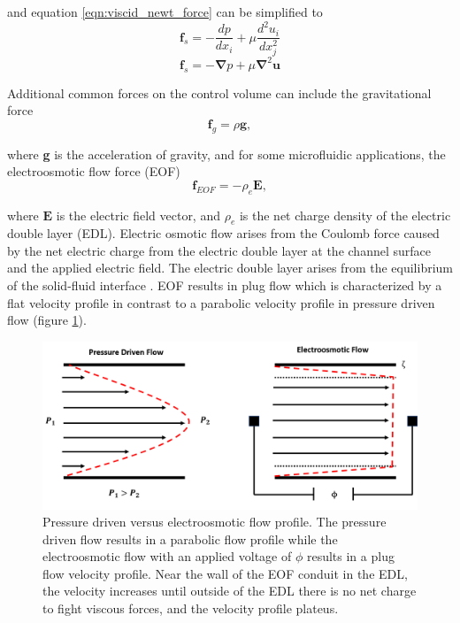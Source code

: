 \noindent and equation \ref{eqn:viscid_newt_force} can be simplified to 
\begin{equation}
    \textbf{f}_s = -\frac{dp}{dx_i} + \mu \frac{d^2u_i}{dx^2_j}
\end{equation}
\begin{equation}
    \textbf{f}_s = -\boldsymbol{\nabla}p + \mu\boldsymbol{\nabla}^2\textbf{u}
    \label{eqn:viscous_pressure_force}
\end{equation}

\par Additional common forces on the control volume can include the gravitational force
\begin{equation}
    \textbf{f}_g = \rho \textbf{g},
    \label{eqn:gravity_force}
\end{equation}

\noindent where \textbf{g} is the acceleration of gravity, and for some microfluidic applications, the electroosmotic flow force (EOF)
\begin{equation}
    \textbf{f}_{EOF} = -\rho_e \boldsymbol{E},
\end{equation}

\noindent where $\boldsymbol{E}$ is the electric field vector, and $\rho_e$ is the net charge density of the electric double layer (EDL). Electric osmotic flow arises from the Coulomb force caused by the net electric charge from the electric double layer at the channel surface and the applied electric field. The electric double layer arises from the equilibrium of the solid-fluid interface \cite{kirby_micro-and_2010}. EOF results in plug flow which is characterized by a flat velocity profile in contrast to a parabolic velocity profile in pressure driven flow (figure \ref{fig:plug_vs_parabolic_flow}).

\begin{figure}[ht]
    \centering
    \includegraphics[width = \textwidth]{images/plugVsParabolic.png}
    \caption[Pressure driven versus electroosmotic flow profile]{Pressure driven versus electroosmotic flow profile. The pressure driven flow results in a parabolic flow profile while the electroosmotic flow with an applied voltage of $\phi$ results in a plug flow velocity profile. Near the wall of the EOF conduit in the EDL, the velocity increases until outside of the EDL there is no net charge to fight viscous forces, and the velocity profile plateus.}
    \label{fig:plug_vs_parabolic_flow}
\end{figure}

